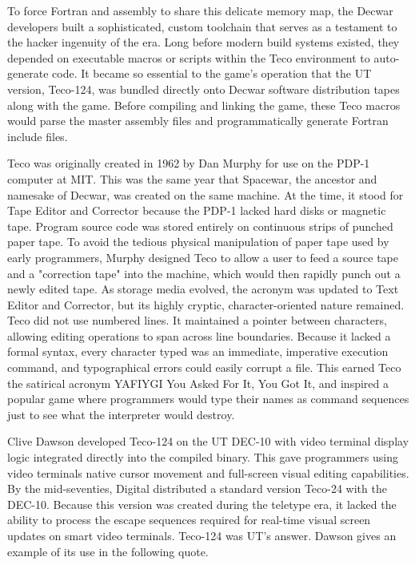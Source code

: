 To force Fortran and assembly to share this delicate memory map, the Decwar developers built a sophisticated, custom toolchain that serves as a testament to the hacker ingenuity of the era. Long before modern build systems existed, they depended on executable macros or scripts within the Teco environment to auto-generate code. It became so essential to the game's operation that the UT version, Teco-124, was bundled directly onto Decwar software distribution tapes along with the game. Before compiling and linking the game, these Teco macros would parse the master assembly files and programmatically generate Fortran include files. 

Teco was originally created in 1962 by Dan Murphy for use on the PDP-1 computer at MIT. This was the same year that Spacewar, the ancestor and namesake of Decwar, was created on the same machine. At the time, it stood for Tape Editor and Corrector because the PDP-1 lacked hard disks or magnetic tape. Program source code was stored entirely on continuous strips of punched paper tape. To avoid the tedious physical manipulation of paper tape used by early programmers, Murphy designed Teco to allow a user to feed a source tape and a "correction tape" into the machine, which would then rapidly punch out a newly edited tape. As storage media evolved, the acronym was updated to Text Editor and Corrector, but its highly cryptic, character-oriented nature remained. Teco did not use numbered lines. It maintained a pointer between characters, allowing editing operations to span across line boundaries. Because it lacked a formal syntax, every character typed was an immediate, imperative execution command, and typographical errors could easily corrupt a file. This earned Teco the satirical acronym YAFIYGI You Asked For It, You Got It, and inspired a popular game where programmers would type their names as command sequences just to see what the interpreter would destroy.

Clive Dawson developed Teco-124 on the UT DEC-10 with video terminal display logic integrated directly into the compiled binary. This gave programmers using video terminals native cursor movement and full-screen visual editing capabilities. By the mid-seventies, Digital distributed a standard version Teco-24 with the DEC-10. Because this version was created during the teletype era, it lacked the ability to process the escape sequences required for real-time visual screen updates on smart video terminals. Teco-124 was UT’s answer. Dawson gives an example of its use in the following quote.

